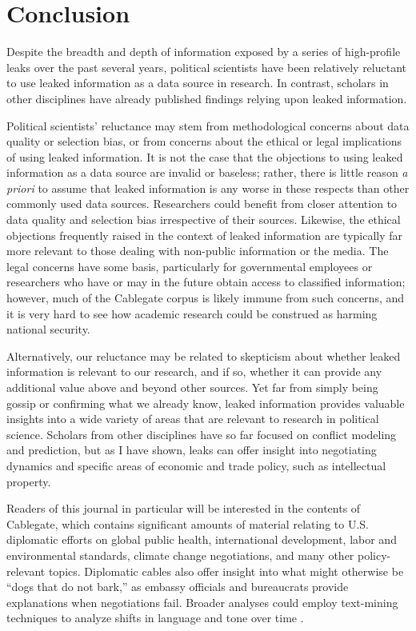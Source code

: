 \documentclass[12pt]{article}
\begin{document}
\section{Conclusion}

Despite the breadth and depth of information exposed by a series of high-profile leaks over the past several years, 
political scientists have been relatively reluctant to use leaked information as a data source in research. 
In contrast, scholars in other disciplines have already published findings relying upon leaked information. 

Political scientists' reluctance may stem from methodological concerns about data quality or selection 
bias, or from concerns about the ethical or legal implications of using leaked information. 
It is not the case that the objections to using leaked information 
as a data source are invalid or baseless; rather, there is little reason \emph{a priori} to assume 
that leaked information is any worse in these respects than other commonly used data sources. 
Researchers could benefit from closer attention to data quality and 
selection bias irrespective of their sources.
Likewise, the ethical objections frequently raised in the context of leaked information are 
typically far more relevant to those dealing with non-public information or the media. The legal concerns have some basis, 
particularly for governmental employees or researchers who have or may in the future obtain access to 
classified information; however, much of the Cablegate corpus is likely immune from such concerns, 
and it is very hard to see how academic research could be construed as harming national security.

Alternatively, our reluctance may be related to skepticism about whether leaked information is relevant 
to our research, and if so, whether it can provide any additional value above and beyond other sources. 
Yet far from simply being gossip or confirming what we already know, leaked information provides 
valuable insights into a wide variety of areas that are relevant to research in political science. 
Scholars from other disciplines have so far focused on conflict modeling and prediction, but as I 
have shown, leaks can offer insight into negotiating dynamics and specific areas of economic and 
trade policy, such as intellectual property.

Readers of this journal in particular will be interested in the contents of Cablegate, which contains 
significant amounts of material relating to U.S. diplomatic efforts on global public health, international 
development, labor and environmental standards, climate change negotiations, and many other policy-relevant topics. 
Diplomatic cables also offer insight into what might otherwise be ``dogs that do not bark,'' as embassy officials and 
bureaucrats provide explanations when negotiations fail.
Broader analyses could employ text-mining techniques to analyze shifts in language and tone over 
time \citet{paruchuri2012tracking}.
\end{document}
